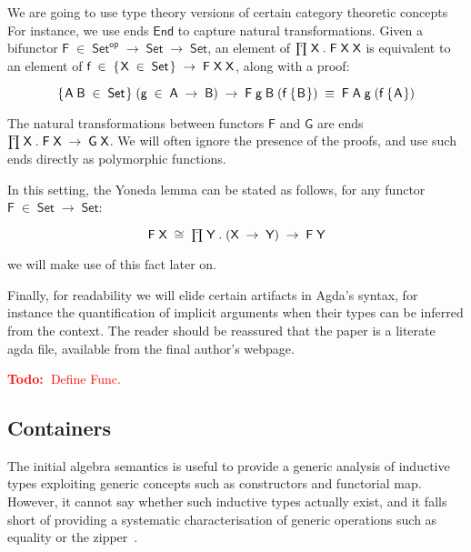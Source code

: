 \documentclass[a4paper]{article}
\newcommand{\todo}[1]{\textcolor{red}{\textbf{Todo:~}#1}}
\newcommand{\Conid}[1]{\mathit{#1}}
\newcommand{\Varid}[1]{\mathit{#1}}
\renewcommand\Varid[1]{\mathord{\textsf{#1}}}
\let\Conid\Varid
\begin{document}
We are going to use type theory versions of certain category theoretic
concepts For instance, we use ends \ensuremath{\Conid{End}} to capture natural transformations.
Given a bifunctor \ensuremath{\Conid{F}\;\in\;\Conid{Set}^{\Varid{op}}\;\rightarrow\;\Conid{Set}\;\rightarrow\;\Conid{Set}}, an element of \ensuremath{\prodd\;\Conid{X}\;.\;\Conid{F}\;\Conid{X}\;\Conid{X}} is
equivalent to an element of \ensuremath{\Varid{f}\;\in\;\{\mskip1.5mu \Conid{X}\;\in\;\Conid{Set}\mskip1.5mu\}\;\rightarrow\;\Conid{F}\;\Conid{X}\;\Conid{X}}, along with a proof:

\[ \mbox{\ensuremath{\{\mskip1.5mu \Conid{A}\;\Conid{B}\;\in\;\Conid{Set}\mskip1.5mu\}\;(\Varid{g}\;\in\;\Conid{A}\;\rightarrow\;\Conid{B})\;\rightarrow\;\Conid{F}\;\Varid{g}\;\Conid{B}\;(\Varid{f}\;\{\mskip1.5mu \Conid{B}\mskip1.5mu\})\;\equiv\;\Conid{F}\;\Conid{A}\;\Varid{g}\;(\Varid{f}\;\{\mskip1.5mu \Conid{A}\mskip1.5mu\})}} \]


\noindent
The natural transformations between functors \ensuremath{\Conid{F}} and \ensuremath{\Conid{G}} are ends \ensuremath{\prodd\;\Conid{X}\;.\;\Conid{F}\;\Conid{X}\;\rightarrow\;\Conid{G}\;\Conid{X}}. We will often ignore the presence of the proofs, and 
use such ends directly as polymorphic functions.

In this setting, the Yoneda lemma can be stated as follows, for any functor \ensuremath{\Conid{F}\;\in\;\Conid{Set}\;\rightarrow\;\Conid{Set}}:

\[\mbox{\ensuremath{\Conid{F}\;\Conid{X}\;\cong\;\prodd\;\Conid{Y}\;.\;(\Conid{X}\;\rightarrow\;\Conid{Y})\;\rightarrow\;\Conid{F}\;\Conid{Y}}}\]

we will make use of this fact later on.

Finally, for readability we will elide certain artifacts in Agda's syntax,
for instance the quantification of implicit arguments when their types can be
inferred from the context. The reader should be reassured that the paper is a
literate agda file, available from the final author's webpage.

\todo{Define Func.}
 
\subsection{Containers}


The initial algebra semantics is useful to provide a generic
analysis of inductive types exploiting generic concepts such as
constructors and functorial map. However, it cannot say whether such inductive
types actually exist, and it falls short of providing a systematic
characterisation of generic operations such as equality or the
zipper~\cite{huet:zipper,conor:derivative}. 
\end{document}
